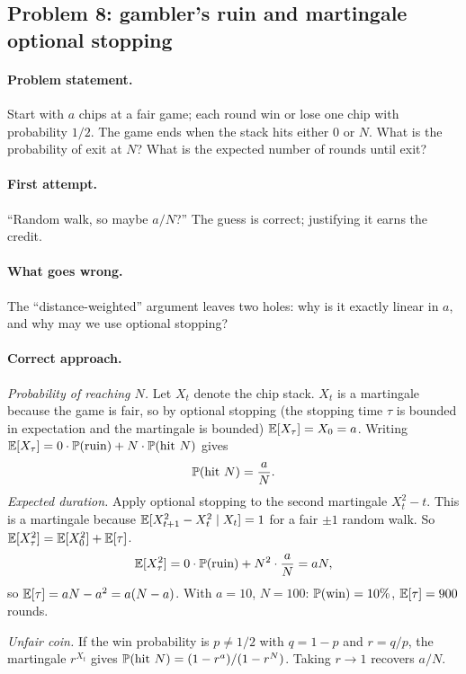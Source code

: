 \subsection{Problem 8: gambler's ruin and martingale optional stopping}
\label{sec:ruin}

\paragraph{Problem statement.}
Start with $a$ chips at a fair game; each round win or lose one
chip with probability $1/2$.  The game ends when the stack hits
either $0$ or $N$.  What is the probability of exit at $N$?
What is the expected number of rounds until exit?

\paragraph{First attempt.}
``Random walk, so maybe $a/N$?''  The guess is correct; justifying
it earns the credit.

\paragraph{What goes wrong.}
The ``distance-weighted'' argument leaves two holes: why is it
exactly linear in $a$, and why may we use optional stopping?

\paragraph{Correct approach.}
\emph{Probability of reaching $N$.}  Let $X_t$ denote the chip
stack.  $X_t$ is a martingale because the game is fair, so by
optional stopping (the stopping time $\tau$ is bounded in
expectation and the martingale is bounded)
$\mathbb{E}[X_\tau] = X_0 = a$.  Writing
$\mathbb{E}[X_\tau] = 0 \cdot \mathbb{P}(\text{ruin}) + N \cdot \mathbb{P}(\text{hit } N)$
gives
\[
\mathbb{P}(\text{hit } N) = \frac{a}{N}.
\]
\emph{Expected duration.}  Apply optional stopping to the second
martingale $X_t^2 - t$.  This is a martingale because
$\mathbb{E}[X_{t+1}^2 - X_t^2 \mid X_t] = 1$ for a fair $\pm 1$ random
walk.  So $\mathbb{E}[X_\tau^2] = \mathbb{E}[X_0^2] + \mathbb{E}[\tau]$.
\[
\mathbb{E}[X_\tau^2]
= 0 \cdot \mathbb{P}(\text{ruin}) + N^2 \cdot \frac{a}{N}
= a N,
\]
so $\mathbb{E}[\tau] = aN - a^2 = a(N-a)$.  With $a = 10$, $N = 100$:
$\mathbb{P}(\text{win}) = 10\%$, $\mathbb{E}[\tau] = 900$ rounds.

\emph{Unfair coin.}  If the win probability is $p \ne 1/2$ with
$q = 1-p$ and $r = q/p$, the martingale $r^{X_t}$ gives
$\mathbb{P}(\text{hit } N) = (1-r^a)/(1-r^N)$.  Taking $r \to 1$
recovers $a/N$.


